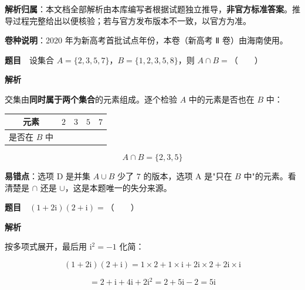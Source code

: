 

\begin{gknotice}
\textbf{解析归属}：本文档全部解析由本库编写者根据试题独立推导，\textbf{非官方标准答案}。推导过程完整给出以便核验；若与官方发布版本不一致，以官方为准。

\textbf{卷种说明}：2020 年为新高考首批试点年份，本卷（新高考 Ⅱ 卷）由海南使用。
\end{gknotice}

\par\medskip



\textbf{题目}　设集合 $A=\{2,3,5,7\}$，$B=\{1,2,3,5,8\}$，则 $A\cap B=$（　　）

\textbf{解析}

交集由\textbf{同时属于两个集合}的元素组成。逐个检验 $A$ 中的元素是否也在 $B$ 中：

\begin{center}
\begin{tabular}{ccccc}
\toprule
元素 & $2$ & $3$ & $5$ & $7$ \\
\midrule
是否在 $B$ 中 &  &  &  &  \\
\bottomrule
\end{tabular}
\end{center}

\[A\cap B=\{2,3,5\}\]


\begin{gktip}
\textbf{易错点}：选项 D 是并集 $A\cup B$ 少了 $7$ 的版本，选项 A 是"只在 $B$ 中"的元素。看清楚是 $\cap$ 还是 $\cup$，这是本题唯一的失分来源。
\end{gktip}

\par\medskip


\textbf{题目}　$(1+2\mathrm i)(2+\mathrm i)=$（　　）

\textbf{解析}

按多项式展开，最后用 $\mathrm i^{2}=-1$ 化简：

\[(1+2\mathrm i)(2+\mathrm i)=1\times2+1\times\mathrm i+2\mathrm i\times2+2\mathrm i\times\mathrm i\]

\[=2+\mathrm i+4\mathrm i+2\mathrm i^{2}=2+5\mathrm i-2=5\mathrm i\]



